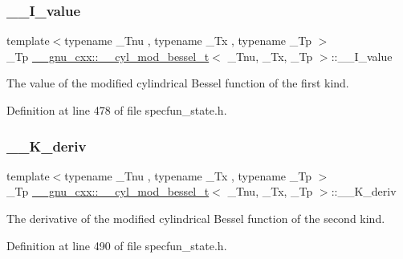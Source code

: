 \subsubsection{\texorpdfstring{\+\_\+\+\_\+\+I\+\_\+value}{\_\_I\_value}}
{\footnotesize\ttfamily template$<$typename \+\_\+\+Tnu , typename \+\_\+\+Tx , typename \+\_\+\+Tp $>$ \\
\+\_\+\+Tp \hyperlink{struct____gnu__cxx_1_1____cyl__mod__bessel__t}{\+\_\+\+\_\+gnu\+\_\+cxx\+::\+\_\+\+\_\+cyl\+\_\+mod\+\_\+bessel\+\_\+t}$<$ \+\_\+\+Tnu, \+\_\+\+Tx, \+\_\+\+Tp $>$\+::\+\_\+\+\_\+\+I\+\_\+value}



The value of the modified cylindrical Bessel function of the first kind. 



Definition at line 478 of file specfun\+\_\+state.\+h.

\mbox{\label{struct____gnu__cxx_1_1____cyl__mod__bessel__t_a8f86a11fb265db76743d80e98be389be}} 
\subsubsection{\texorpdfstring{\+\_\+\+\_\+\+K\+\_\+deriv}{\_\_K\_deriv}}
{\footnotesize\ttfamily template$<$typename \+\_\+\+Tnu , typename \+\_\+\+Tx , typename \+\_\+\+Tp $>$ \\
\+\_\+\+Tp \hyperlink{struct____gnu__cxx_1_1____cyl__mod__bessel__t}{\+\_\+\+\_\+gnu\+\_\+cxx\+::\+\_\+\+\_\+cyl\+\_\+mod\+\_\+bessel\+\_\+t}$<$ \+\_\+\+Tnu, \+\_\+\+Tx, \+\_\+\+Tp $>$\+::\+\_\+\+\_\+\+K\+\_\+deriv}



The derivative of the modified cylindrical Bessel function of the second kind. 



Definition at line 490 of file specfun\+\_\+state.\+h.

\mbox{\label{struct____gnu__cxx_1_1____cyl__mod__bessel__t_a481e4c4537583c461654405c01c25566}} 
